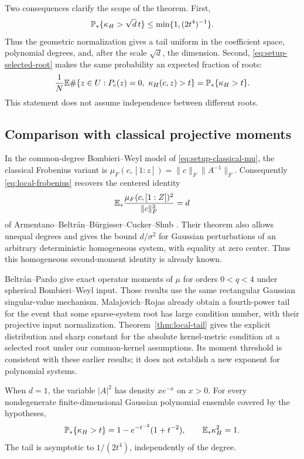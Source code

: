Two consequences clarify the scope of the theorem.  First,
\begin{equation}\label{eq:local-dimension-tail}
  \mathbb P_*\{\kappa_H>\sqrt d\,t\}
  \leq\min\{1,(2t^4)^{-1}\}.
\end{equation}
Thus the geometric normalization gives a tail uniform in the coefficient
space, polynomial degrees, and, after the scale $\sqrt d$, the dimension.
Second, \eqref{eq:setup-selected-root} makes the same probability an expected
fraction of roots:
\[
  \frac1N\E\#\{z\in U:P_c(z)=0,\ \kappa_H(c,z)>t\}
  =\Pstar\{\kappa_H>t\}.
\]
This statement does not assume independence between different roots.

\subsection{Comparison with classical projective moments}
\label{sec:local-classical}

In the common-degree Bombieri--Weyl model of
\eqref{eq:setup-classical-mu}, the classical Frobenius variant is
$\mu_F(c,[1:z])=\|c\|_F\|A^{-1}\|_F$.
Consequently \eqref{eq:local-frobenius} recovers the centered identity
\begin{equation}\label{eq:local-known-frobenius}
 \mathbb E_*\frac{\mu_F(c,[1:Z])^2}{\|c\|_F^2}=d
\end{equation}
of Armentano--Beltr\'an--B\"urgisser--Cucker--Shub
\cite[Theorem~2]{armentano2016condition}. Their theorem also allows unequal
degrees and gives the bound $d/\sigma^2$ for Gaussian perturbations of an
arbitrary deterministic homogeneous system, with equality at zero center.
Thus this homogeneous second-moment identity is already known.

Beltr\'an--Pardo \cite[Sections~7--8]{beltran2011fast} give exact operator
moments of $\mu$ for orders $0<q<4$ under spherical Bombieri--Weyl input.
Those results use the same rectangular Gaussian singular-value mechanism.
Malajovich--Rojas \cite[Theorem~1]{malajovich2004high} already obtain a
fourth-power tail for the event that some sparse-system root has large
condition number, with their projective input normalization.
Theorem~\ref{thm:local-tail} gives the explicit distribution and sharp
constant for the absolute kernel-metric condition at a selected root under
our common-kernel assumptions. Its moment threshold is consistent with these
earlier results; it does not establish a new exponent for polynomial systems.

\begin{example}\label{ex:local-one-variable}
  When $d=1$, the variable $|A|^2$ has density $x e^{-x}$ on $x>0$.
  For every nondegenerate finite-dimensional Gaussian polynomial ensemble
  covered by the hypotheses,
  \[
    \mathbb P_*\{\kappa_H>t\}
      =1-e^{-t^{-2}}(1+t^{-2}),\qquad
    \mathbb E_*\kappa_H^2=1.
  \]
  The tail is asymptotic to $1/(2t^4)$, independently of the degree.
\end{example}

